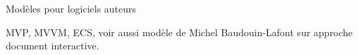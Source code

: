 
      \begin{block}{Modèles pour logiciels auteurs}
          
        MVP, MVVM, ECS, voir aussi modèle de Michel Baudouin-Lafont sur approche document interactive.
      \end{block}